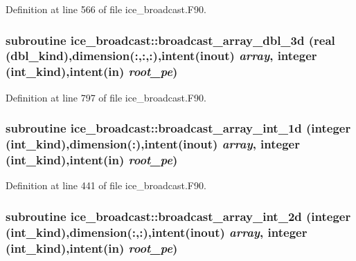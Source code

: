 Definition at line 566 of file ice\_\-broadcast.F90.\hypertarget{namespaceice__broadcast_ab80a5a2d64cdf81863b36b8cd172e6d8}{
\subsubsection[{broadcast\_\-array\_\-dbl\_\-3d}]{\setlength{\rightskip}{0pt plus 5cm}subroutine ice\_\-broadcast::broadcast\_\-array\_\-dbl\_\-3d (real (dbl\_\-kind),dimension(:,:,:),intent(inout) {\em array}, \/  integer (int\_\-kind),intent(in) {\em root\_\-pe})}}
\label{namespaceice__broadcast_ab80a5a2d64cdf81863b36b8cd172e6d8}


Definition at line 797 of file ice\_\-broadcast.F90.\hypertarget{namespaceice__broadcast_a8e560ce5af3aaac47d995fef6d8227f5}{
\subsubsection[{broadcast\_\-array\_\-int\_\-1d}]{\setlength{\rightskip}{0pt plus 5cm}subroutine ice\_\-broadcast::broadcast\_\-array\_\-int\_\-1d (integer (int\_\-kind),dimension(:),intent(inout) {\em array}, \/  integer (int\_\-kind),intent(in) {\em root\_\-pe})}}
\label{namespaceice__broadcast_a8e560ce5af3aaac47d995fef6d8227f5}


Definition at line 441 of file ice\_\-broadcast.F90.\hypertarget{namespaceice__broadcast_a9b33c193842a02dc83a74c98cafd4dd0}{
\subsubsection[{broadcast\_\-array\_\-int\_\-2d}]{\setlength{\rightskip}{0pt plus 5cm}subroutine ice\_\-broadcast::broadcast\_\-array\_\-int\_\-2d (integer (int\_\-kind),dimension(:,:),intent(inout) {\em array}, \/  integer (int\_\-kind),intent(in) {\em root\_\-pe})}}
\label{namespaceice__broadcast_a9b33c193842a02dc83a74c98cafd4dd0}


